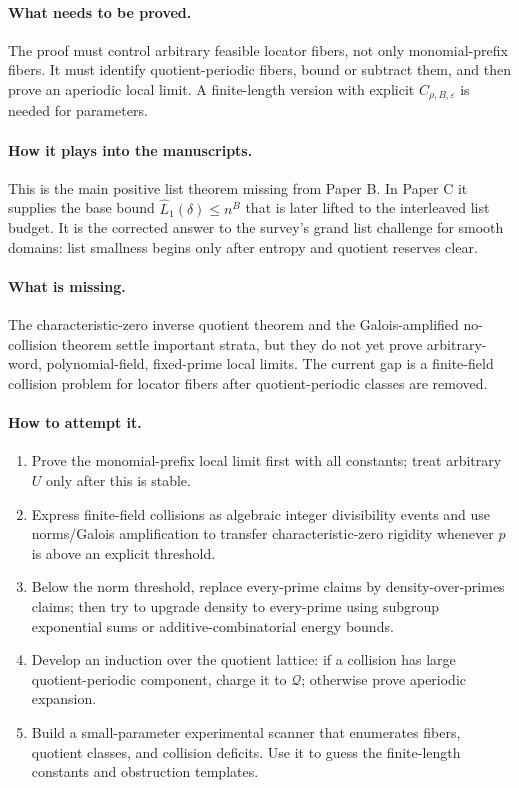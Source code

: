 \documentclass[11pt]{article}
\theoremstyle{definition}
\theoremstyle{remark}
\newcommand{\eps}{\varepsilon}
\newcommand{\Qprof}{\mathcal Q}
\newcommand{\paperB}{Paper B}
\newcommand{\paperC}{Paper C}
\begin{document}
\paragraph{What needs to be proved.}  The proof must control arbitrary feasible locator fibers, not only monomial-prefix fibers.  It must identify quotient-periodic fibers, bound or subtract them, and then prove an aperiodic local limit.  A finite-length version with explicit $C_{\rho,B,\eps}$ is needed for parameters.

\paragraph{How it plays into the manuscripts.}  This is the main positive list theorem missing from \paperB.  In \paperC{} it supplies the base bound $\widehat L_1(\delta)\le n^B$ that is later lifted to the interleaved list budget.  It is the corrected answer to the survey's grand list challenge for smooth domains: list smallness begins only after entropy and quotient reserves clear.

\paragraph{What is missing.}  The characteristic-zero inverse quotient theorem and the Galois-amplified no-collision theorem settle important strata, but they do not yet prove arbitrary-word, polynomial-field, fixed-prime local limits.  The current gap is a finite-field collision problem for locator fibers after quotient-periodic classes are removed.

\paragraph{How to attempt it.}
\begin{enumerate}[leftmargin=2.2em]
\item Prove the monomial-prefix local limit first with all constants; treat arbitrary $U$ only after this is stable.
\item Express finite-field collisions as algebraic integer divisibility events and use norms/Galois amplification to transfer characteristic-zero rigidity whenever $p$ is above an explicit threshold.
\item Below the norm threshold, replace every-prime claims by density-over-primes claims; then try to upgrade density to every-prime using subgroup exponential sums or additive-combinatorial energy bounds.
\item Develop an induction over the quotient lattice: if a collision has large quotient-periodic component, charge it to $\Qprof$; otherwise prove aperiodic expansion.
\item Build a small-parameter experimental scanner that enumerates fibers, quotient classes, and collision deficits.  Use it to guess the finite-length constants and obstruction templates.
\end{enumerate}
\end{document}
